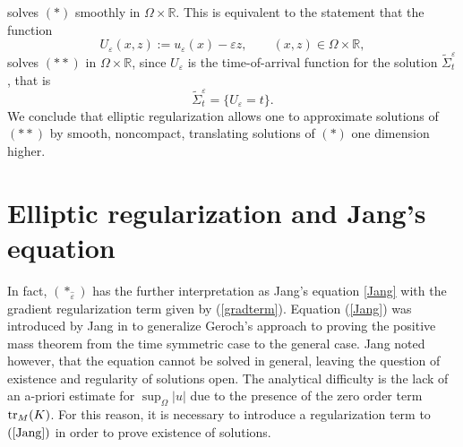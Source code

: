 \documentclass[11pt]{amsart}
\def\wt{\widetilde}
\begin{document}
solves $(*)$ smoothly in $\Omega\times\mathbb{R}$. This is equivalent to the statement that the function 
\begin{equation*}U_{\varepsilon}(x,z):=u_{\varepsilon}(x)-\varepsilon z,\quad\quad(x,z)\in\Omega\times\mathbb{R},
\end{equation*}
solves $(**)$ in $\Omega\times\mathbb{R}$, since $U_{\varepsilon}$ is the time-of-arrival function for the solution $\wt\Sigma^{\varepsilon}_t$, that is
\begin{equation}\label{ellip}
 \wt\Sigma^{\varepsilon}_t=\{U_{\varepsilon}=t\}.
\end{equation}
We conclude that elliptic regularization allows one to approximate solutions of $(**)$ by smooth, noncompact, translating solutions of $(*)$ one dimension higher. 

\section{Elliptic regularization and Jang's equation}\label{ellregsection}
In fact, $(*_{\hat{\varepsilon}})$ has the further interpretation as Jang's equation \eqref{Jang}
with the gradient regularization term given by (\ref{gradterm}). Equation (\ref{Jang}) was introduced by Jang in  \cite{J78} to generalize Geroch's \cite{G73} approach to proving the positive mass theorem from the time symmetric case to the general case. Jang noted however, that the equation cannot be solved in general, leaving the question of existence and regularity of solutions open. The analytical difficulty is the lack of an a-priori estimate for $\sup_\Omega |u|$ due to the presence of the zero order term $\operatorname{tr}_M(K)$. For this reason, it is necessary to introduce a regularization term to $(\ref{Jang})$ in order to prove existence of solutions. 
\end{document}
